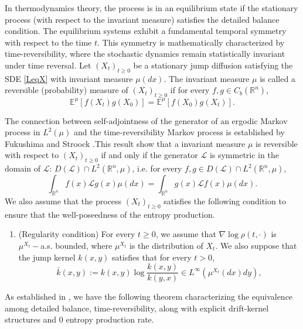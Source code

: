 \documentclass[10pt]{article}
\theoremstyle{definition}
\numberwithin{equation}{section}
\begin{document}
In thermodynamics theory, the process is in an equilibrium state if the stationary process (with respect to the invariant measure) satisfies the detailed balance condition. The equilibrium systems exhibit a fundamental temporal symmetry with respect to the time $t$. This symmetry is mathematically characterized by time-reversibility, where the stochastic dynamics remain statistically invariant under time reversal. 
Let $(X_t)_{t\geq 0}$ be a stationary jump diffusion satisfying the SDE \eqref{LeqX} with invariant measure $\mu(dx)$. 
The invariant measure $\mu$ is called a reversible (probability) measure of $(X_t)_{t\geq 0}$ if for every $f,g \in C_{b}(\mathbb{R}^n)$,
\begin{equation*}
    \mathbb{E}^{\mu}[f(X_t)g(X_0)]  = \mathbb{E}^{\mu}[f(X_0)g(X_t)].
\end{equation*}


The connection between self-adjointness of the generator of an ergodic Markov process in $L^2(\mu)$ and the time-reversibility Markov process is established by Fukushima and Stroock \cite[Theorem 2.3]{FS86}.This result show that a invariant measure $\mu$ is reversible with respect to $(X_t)_{t\geq 0}$ if and only if the generator $\mathcal{L}$ is symmetric in the domain of $\mathcal{L}$: $D(\mathcal{L}) \cap L^2(\mathbb{R}^n, \mu)$, i.e. for every $f,g \in D(\mathcal{L}) \cap L^2(\mathbb{R}^n, \mu)$,
\begin{equation*}
    \int_{\mathbb{R}^n} f(x) \mathcal{L}g(x) \mu(dx) = \int_{\mathbb{R}^n} g(x) \mathcal{L} f(x) \mu(dx).
\end{equation*}
We also assume that the process $(X_t)_{t \geq 0}$ satisfies the following condition to ensure that the well-poseedness of the entropy production.
\begin{enumerate}
    \item[({\bf E})] (Regularity condition) For every $t \geq 0$, we assume that $\nabla\log \rho(t,\cdot)$ is $\mu^{X_t}-$a.s. bounded, where $\mu^{X_t}$ is the distribution of $X_t$. We also suppose that the jump kernel $k(x,y)$ satisfies that for every $t>0$,
\begin{equation}\label{ratiolim}
    \bar{k}(x,y):= k(x,y)\log \frac{k(x,y)}{k(y,x)} \in L^{\infty}(\mu^{X_t}(dx)dy),
\end{equation}
\end{enumerate} 

As established in \cite[Theorem 5.1]{ZL25}, we have the following theorem characterizing the equivalence among detailed balance, time-reversibility, along with explicit drift-kernel structures and $0$ entropy production rate.
\end{document}
